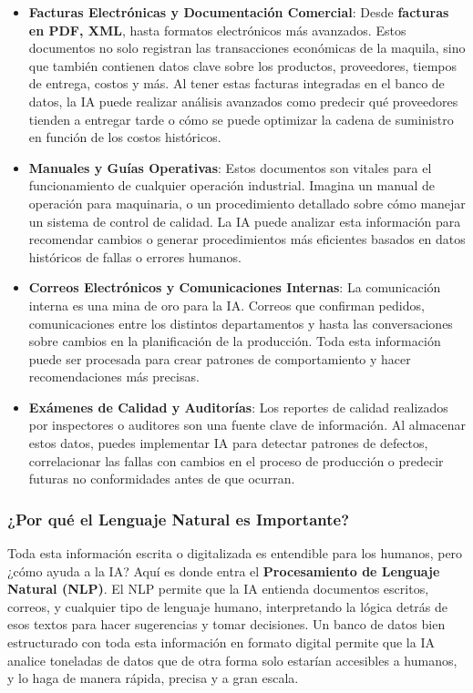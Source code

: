 \documentclass[
  10pt,
  letterpaper,
]{book}
\begin{document}
\begin{itemize}
\item
  \textbf{Facturas Electrónicas y Documentación Comercial}: Desde
  \textbf{facturas en PDF, XML}, hasta formatos electrónicos más
  avanzados. Estos documentos no solo registran las transacciones
  económicas de la maquila, sino que también contienen datos clave sobre
  los productos, proveedores, tiempos de entrega, costos y más. Al tener
  estas facturas integradas en el banco de datos, la IA puede realizar
  análisis avanzados como predecir qué proveedores tienden a entregar
  tarde o cómo se puede optimizar la cadena de suministro en función de
  los costos históricos.
\item
  \textbf{Manuales y Guías Operativas}: Estos documentos son vitales
  para el funcionamiento de cualquier operación industrial. Imagina un
  manual de operación para maquinaria, o un procedimiento detallado
  sobre cómo manejar un sistema de control de calidad. La IA puede
  analizar esta información para recomendar cambios o generar
  procedimientos más eficientes basados en datos históricos de fallas o
  errores humanos.
\item
  \textbf{Correos Electrónicos y Comunicaciones Internas}: La
  comunicación interna es una mina de oro para la IA. Correos que
  confirman pedidos, comunicaciones entre los distintos departamentos y
  hasta las conversaciones sobre cambios en la planificación de la
  producción. Toda esta información puede ser procesada para crear
  patrones de comportamiento y hacer recomendaciones más precisas.
\item
  \textbf{Exámenes de Calidad y Auditorías}: Los reportes de calidad
  realizados por inspectores o auditores son una fuente clave de
  información. Al almacenar estos datos, puedes implementar IA para
  detectar patrones de defectos, correlacionar las fallas con cambios en
  el proceso de producción o predecir futuras no conformidades antes de
  que ocurran.
\end{itemize}

\subsubsection{¿Por qué el Lenguaje Natural es
Importante?}\label{por-quuxe9-el-lenguaje-natural-es-importante}

Toda esta información escrita o digitalizada es entendible para los
humanos, pero ¿cómo ayuda a la IA? Aquí es donde entra el
\textbf{Procesamiento de Lenguaje Natural (NLP)}. El NLP permite que la
IA entienda documentos escritos, correos, y cualquier tipo de lenguaje
humano, interpretando la lógica detrás de esos textos para hacer
sugerencias y tomar decisiones. Un banco de datos bien estructurado con
toda esta información en formato digital permite que la IA analice
toneladas de datos que de otra forma solo estarían accesibles a humanos,
y lo haga de manera rápida, precisa y a gran escala.
\end{document}
